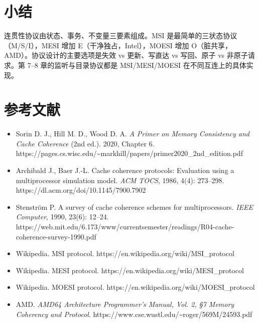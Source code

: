 \section{小结}

连贯性协议由状态、事务、不变量三要素组成。MSI 是最简单的三状态协议（M/S/I），MESI 增加 E（干净独占，Intel），MOESI 增加 O（脏共享，AMD）。协议设计的主要选项是失效 vs 更新、写直达 vs 写回、原子 vs 非原子请求。第 7–8 章的监听与目录协议都是 MSI/MESI/MOESI 在不同互连上的具体实现。

\section*{参考文献}
\begin{itemize}
\item Sorin D. J., Hill M. D., Wood D. A. \emph{A Primer on Memory Consistency and Cache Coherence} (2nd ed.). 2020, Chapter 6. https://pages.cs.wisc.edu/\textasciitilde{}markhill/papers/primer2020\_2nd\_edition.pdf
\item Archibald J., Baer J.-L. Cache coherence protocols: Evaluation using a multiprocessor simulation model. \emph{ACM TOCS}, 1986, 4(4): 273–298. https://dl.acm.org/doi/10.1145/7900.7902
\item Stenström P. A survey of cache coherence schemes for multiprocessors. \emph{IEEE Computer}, 1990, 23(6): 12–24. https://web.mit.edu/6.173/www/currentsemester/readings/R04-cache-coherence-survey-1990.pdf
\item Wikipedia. MSI protocol. https://en.wikipedia.org/wiki/MSI\_protocol
\item Wikipedia. MESI protocol. https://en.wikipedia.org/wiki/MESI\_protocol
\item Wikipedia. MOESI protocol. https://en.wikipedia.org/wiki/MOESI\_protocol
\item AMD. \emph{AMD64 Architecture Programmer's Manual, Vol. 2, §7 Memory Coherency and Protocol}. https://www.cse.wustl.edu/\textasciitilde{}roger/569M/24593.pdf
\end{itemize}
